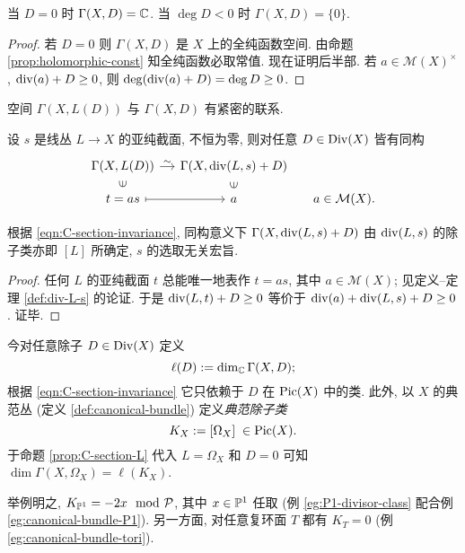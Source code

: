\begin{lemma}\label{prop:low-degree-vanishing}
	当 $D=0$ 时 $\Gamma(X,D) = \mathbb{C}$. 当 $\deg D < 0$ 时 $\Gamma(X,D) = \{0\}$.
\end{lemma}
\begin{proof}
	若 $D=0$ 则 $\Gamma(X,D)$ 是 $X$ 上的全纯函数空间. 由命题 \ref{prop:holomorphic-const} 知全纯函数必取常值.	现在证明后半部. 若 $a \in \mathcal{M}(X)^\times$, $\operatorname{div}(a) + D \geq 0$, 则 $\deg(\operatorname{div}(a) + D) = \deg D \geq 0$.
\end{proof}

空间 $\Gamma(X, L(D))$ 与 $\Gamma(X, D)$ 有紧密的联系.
\begin{proposition}\label{prop:C-section-L}
	设 $s$ 是线丛 $ L \to X$ 的亚纯截面, 不恒为零, 则对任意 $D \in \operatorname{Div}(X)$ 皆有同构
	\[\begin{tikzcd}[row sep=small, column sep=small]
		\Gamma(X, L(D)) \arrow[r, "\sim"] & \Gamma(X, \divisor(L,s) + D) & \\
		t = as \arrow[mapsto, r] \arrow[phantom, u, "\in" sloped] & a \arrow[phantom, u, "\in" sloped] & a \in \mathcal{M}(X).
	\end{tikzcd}\]
\end{proposition}

根据 \eqref{eqn:C-section-invariance}, 同构意义下 $\Gamma(X, \operatorname{div}(L,s) + D)$ 由 $\operatorname{div}(L,s)$ 的除子类亦即 $[L]$ 所确定, $s$ 的选取无关宏旨.
\begin{proof}
	任何 $L$ 的亚纯截面 $t$ 总能唯一地表作 $t=as$, 其中 $a \in \mathcal{M}(X)$; 见定义--定理 \ref{def:div-L-s} 的论证. 于是 $\operatorname{div}(L,t)+D \geq 0$ 等价于 $\operatorname{div}(a) + \operatorname{div}(L,s) + D \geq 0$. 证毕.
\end{proof}

\begin{definition} 
	 
	今对任意除子 $D \in \operatorname{Div}(X)$ 定义
	\[ \ell(D) := \dim_{\mathbb{C}} \Gamma(X, D); \]
	根据 \eqref{eqn:C-section-invariance} 它只依赖于 $D$ 在 $\operatorname{Pic}(X)$ 中的类. 此外, 以 $X$ 的典范丛 (定义 \ref{def:canonical-bundle}) 定义\emph{典范除子类}
	\[ K_X := [\Omega_X] \; \in \operatorname{Pic}(X). \]
	于命题 \ref{prop:C-section-L} 代入 $L = \Omega_X$ 和 $D=0$ 可知 $\dim \Gamma(X, \Omega_X) = \ell(K_X)$.
\end{definition}
举例明之, $K_{\mathbb{P}^1} = -2x \mod \mathcal{P}$, 其中 $x \in \mathbb{P}^1$ 任取 (例 \ref{eg:P1-divisor-class} 配合例 \ref{eg:canonical-bundle-P1}). 另一方面, 对任意复环面 $T$ 都有 $K_T = 0$ (例 \ref{eg:canonical-bundle-tori}).

